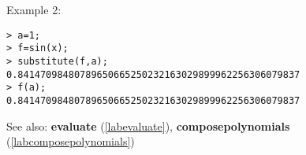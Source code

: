 \noindent Example 2: 
\begin{center}\begin{minipage}{15cm}\begin{Verbatim}[frame=single,commandchars=\\\|\~]
> a=1;
> f=sin(x);
> substitute(f,a);
0.84147098480789650665250232163029899962256306079837
> f(a);
0.84147098480789650665250232163029899962256306079837
\end{Verbatim}
\end{minipage}\end{center}
See also: \textbf{evaluate} (\ref{labevaluate}), \textbf{composepolynomials} (\ref{labcomposepolynomials})
